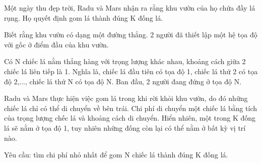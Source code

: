 Một ngày thu đẹp trời, Radu và Mars nhận ra rằng khu vườn của họ chứa đầy lá rụng. Họ quyết định gom lá thành đúng K đống lá.  

   Biết rằng khu vườn có dạng một đường thẳng. 2 người đã thiết lập một hệ tọa độ với gốc ở điểm đầu của khu vườn.  

   Có N chiếc lá nằm thẳng hàng với trọng lượng khác nhau, khoảng cách giữa 2 chiếc lá liên tiếp là 1. Nghĩa là, chiếc lá đầu tiên có tọa độ 1, chiếc lá   thứ 2 có tọa độ 2,..., chiếc lá thứ N có tọa độ N. Ban đầu, 2 người đang đứng ở tọa độ N.  

   Radu và Mars thực hiện việc gom lá trong khi rời khỏi khu vườn, do đó những chiếc lá chỉ có thể di chuyển về bên trái. Chi phí di chuyển một chiếc   lá bằng tích của trọng lượng chếc lá và khoảng cách di chuyển. Hiển nhiên, một trong K đống lá sẽ nằm ở tọa độ 1, tuy nhiên những đống còn lại có thể   nằm ở bất kỳ vị trí nào.  

   Yêu cầu: tìm chi phí nhỏ nhất để gom N chiếc lá thành đúng K đống lá.